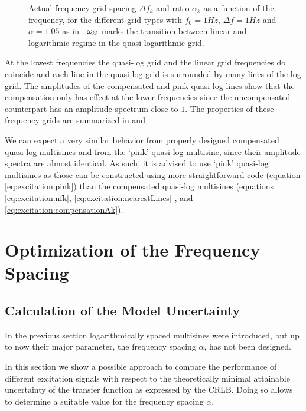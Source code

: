   \begin{figure}
    \centering
    \setlength{}
    \setlength\figureheight{0.68\figurewidth}
    
    \caption[Actual frequency grid spacing and ratio for different grids]{Actual frequency grid spacing $\Delta f_k$ and ratio $\alpha_k$ as a function of the frequency, for the different grid types with $f_0 =1\unit{Hz}$, $\Delta f = 1\unit{Hz}$ and $\alpha =1.05$ as in . $\omega_{\ell \ell}$ marks the transition between linear and logarithmic regime in the quasi-logarithmic grid.}
    \label{fig:excitation:gridPropertyPlots}
  \end{figure}

  At the lowest frequencies the quasi-log grid and the linear grid frequencies do coincide and each line in the quasi-log grid is surrounded by many lines of the log grid.
  The amplitudes of the compensated and pink quasi-log lines show that the compensation only has effect at the lower frequencies since the uncompensated counterpart has an amplitude spectrum close to $1$.
  The properties of these frequency grids are summarized in  and .

  We can expect a very similar behavior from properly designed compensated quasi-log multisines and from the `pink' quasi-log multisine, since their amplitude spectra are almost identical.
  As such, it is advised to use `pink' quasi-log multisines as those can be constructed using more straightforward code (equation \eqref{eq:excitation:pink}) than the compensated quasi-log multisines (equations \eqref{eq:excitation:nfk}, \eqref{eq:excitation:nearestLines} , and \eqref{eq:excitation:compensationAk}).

\section{Optimization of the Frequency Spacing} 
\label{sec:excitation:optimAlpha}
  \subsection{Calculation of the Model Uncertainty}
  In the previous section logarithmically spaced multisines were introduced, but up to now their major parameter, the frequency spacing $\alpha$, has not been designed.

  In this section we show a possible approach to compare the performance of different excitation signals with respect to the theoretically minimal attainable uncertainty of the transfer function as expressed by the \gls{CRLB}.
  Doing so allows to determine a suitable value for the frequency spacing $\alpha$.

